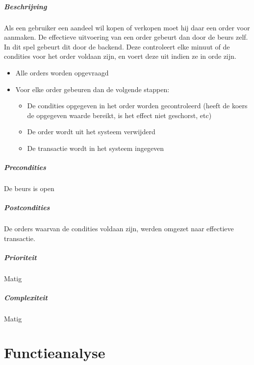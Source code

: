 \paragraph{Beschrijving} Als een gebruiker een aandeel wil kopen of verkopen moet hij daar een order voor aanmaken. De effectieve uitvoering van een order gebeurt dan door de beurs zelf. In dit spel gebeurt dit door de backend. Deze controleert elke minuut of de condities voor het order voldaan zijn, en voert deze uit indien ze in orde zijn.

\begin{itemize}
	\item Alle orders worden opgevraagd
  \item Voor elke order gebeuren dan de volgende stappen:
	\begin{itemize}
		\item De condities opgegeven in het order worden gecontroleerd (heeft de koers de opgegeven waarde bereikt, is het effect niet geschorst, etc)
		\item De order wordt uit het systeem verwijderd
		\item De transactie wordt in het systeem ingegeven
	\end{itemize}
\end{itemize}
\paragraph{Precondities} De beurs is open 
\paragraph{Postcondities} De orders waarvan de condities voldaan zijn, werden omgezet naar effectieve transactie.
\paragraph{Prioriteit}Matig
\paragraph{Complexiteit}Matig

\chapter{Functieanalyse}

